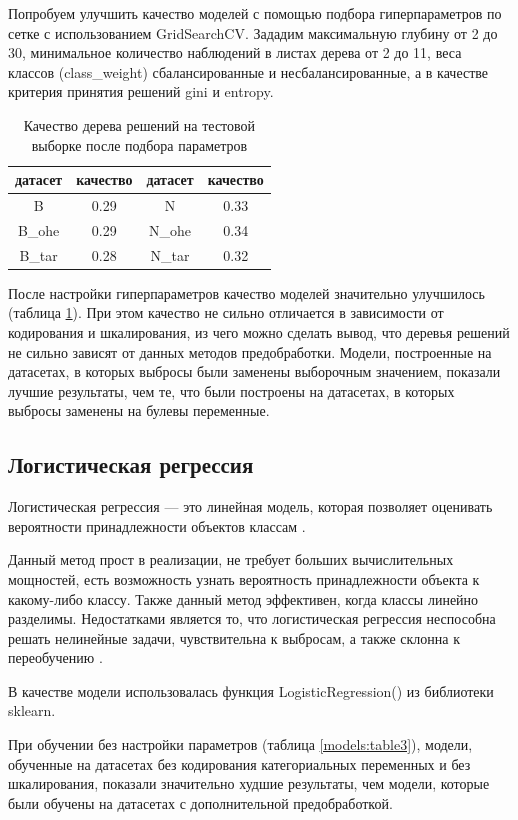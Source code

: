 \documentclass[14pt]{mmcs_article}
\begin{document}
Попробуем улучшить качество моделей с помощью подбора гиперпараметров по сетке с использованием GridSearchCV. Зададим максимальную глубину от 2 до 30, минимальное количество наблюдений в листах дерева от 2 до 11, веса классов (class\_weight) сбалансированные и несбалансированные, а в качестве критерия принятия решений gini и entropy.

\begin{table}[H]
	\centering
	\caption{Качество дерева решений на тестовой выборке после подбора параметров}\label{models:table2}
	\begin{tabular}{cccc}
		\hline
		датасет & качество	& датасет & качество \\
		\hline
		B &	0.29 &	N &	0.33 \\
		B\_ohe & 0.29 &	N\_ohe & 0.34\\
		B\_tar & 0.28 & N\_tar & 0.32 \\
		\hline
	\end{tabular}
\end{table}

После настройки гиперпараметров качество моделей значительно улучшилось (таблица \ref{models:table2}). При этом качество не сильно отличается в зависимости от кодирования и шкалирования, из чего можно сделать вывод, что деревья решений не сильно зависят от данных методов предобработки. Модели, построенные на датасетах, в которых выбросы были заменены выборочным значением, показали лучшие результаты, чем те, что были построены на датасетах, в которых выбросы заменены на булевы переменные. 


\subsection{Логистическая регрессия}

Логистическая регрессия --- это линейная модель, которая позволяет оценивать вероятности принадлежности объектов классам \cite{lib:logreg}.

Данный метод прост в реализации, не требует больших вычислительных мощностей, есть возможность узнать вероятность принадлежности объекта к какому-либо классу. Также данный метод эффективен, когда классы линейно разделимы. Недостатками является то, что логистическая регрессия неспособна решать нелинейные задачи, чувствительна к выбросам, а также склонна к переобучению \cite{lib:logreg2}.

В качестве модели использовалась функция LogisticRegression() из библиотеки sklearn.

При обучении без настройки параметров (таблица \ref{models:table3}), модели, обученные на датасетах без кодирования категориальных переменных и без шкалирования, показали значительно худшие результаты, чем модели, которые были обучены на датасетах с дополнительной предобработкой.
\end{document}
